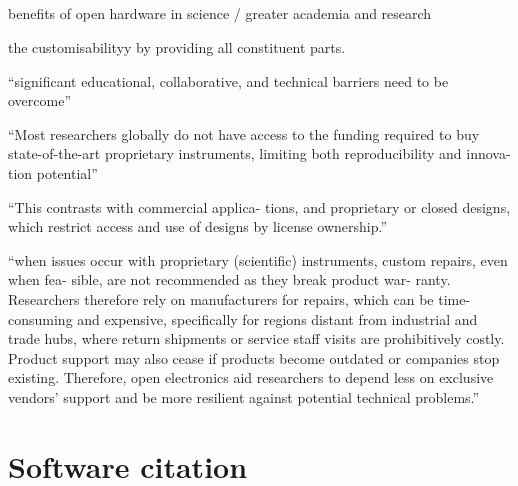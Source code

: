 \subsection{\cite{fiordelmondo_longevity_2024}}

benefits of open hardware in science / greater academia and research 

the customisabilityy by providing all constituent parts.

``significant educational, collaborative, and technical barriers need to be overcome''
 



``Most researchers globally do not have access to the funding required to buy state-of-the-art proprietary instruments, limiting both reproducibility and innova- tion potential''

``This contrasts with commercial applica- tions, and proprietary or closed designs, which restrict access and use of designs by license ownership.''


``when issues occur with proprietary (scientific) instruments, custom repairs, even when fea- sible, are not recommended as they break product war- ranty. Researchers therefore rely on manufacturers for repairs, which can be time-consuming and expensive, specifically for regions distant from industrial and trade hubs, where return shipments or service staff visits are prohibitively costly. Product support may also cease if products become outdated or companies stop existing. Therefore, open electronics aid researchers to depend less on exclusive vendors’ support and be more resilient against potential technical problems.''

\section{Software citation}

\subsection{\cite{stall_journal_2023}}

\subsection{\cite{soito_citations_2016}}

\subsection{\cite{katz_recognizing_2021}}



